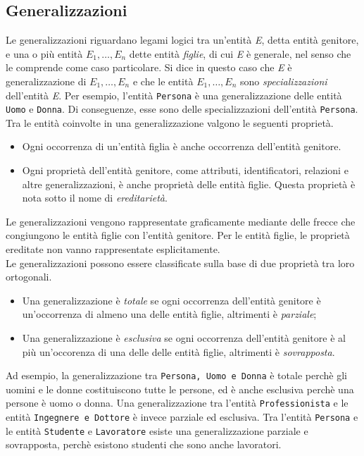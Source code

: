 \documentclass[12pt]{report}
\begin{document}
 	\subsection{Generalizzazioni}
 	Le generalizzazioni riguardano legami logici tra un'entità \textit{E}, detta entità genitore, e una o più entità $E_1, \dots, E_n$ dette entità \textit{figlie}, di cui \textit{E} è generale, nel senso che le comprende come caso particolare. Si dice in questo caso che \textit{E} è generalizzazione di $E_1, \dots, E_n$ e che le entità $E_1, \dots, E_n$ sono \textit{specializzazioni} dell'entità \textit{E}. Per esempio, l'entità \texttt{Persona} è una generalizzazione delle entità \texttt{Uomo} e \texttt{Donna}. Di conseguenze, esse sono delle specializzazioni dell'entità \texttt{Persona}. \\
 	Tra le entità coinvolte in una generalizzazione valgono le seguenti proprietà.
 	\begin{itemize}
 		\item Ogni occorrenza di un'entità figlia è anche occorrenza dell'entità genitore.
 		\item Ogni proprietà dell'entità genitore, come attributi, identificatori, relazioni e altre generalizzazioni, è anche proprietà delle entità figlie. Questa proprietà è nota sotto il nome di \textit{ereditarietà}.
 	\end{itemize}
 	Le generalizzazioni vengono rappresentate graficamente mediante delle frecce che congiungono le entità figlie con l'entità genitore. Per le entità figlie, le proprietà ereditate non vanno rappresentate esplicitamente. \\
 	Le generalizzazioni possono essere classificate sulla base di due proprietà tra loro ortogonali.
 	\begin{itemize}
 		\item Una generalizzazione è \textit{totale} se ogni occorrenza dell'entità genitore è un'occorrenza di almeno una delle entità figlie, altrimenti è \textit{parziale};
 		\item Una generalizzazione è \textit{esclusiva} se ogni occorrenza dell'entità genitore è al più un'occorenza di una delle delle entità figlie, altrimenti è \textit{sovrapposta}.
 	\end{itemize}
 	Ad esempio, la generalizzazione tra \texttt{Persona, Uomo e Donna} è totale perchè gli uomini e le donne costituiscono tutte le persone, ed è anche esclusiva perchè una persone è uomo o donna. Una generalizzazione tra l'entità \texttt{Professionista} e le entità \texttt{Ingegnere e Dottore} è invece parziale ed esclusiva. Tra l'entità \texttt{Persona} e le entità \texttt{Studente} e \texttt{Lavoratore} esiste una generalizzazione parziale e sovrapposta, perchè esistono studenti che sono anche lavoratori. \\
\end{document}
